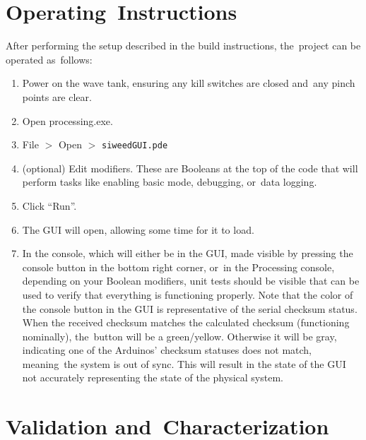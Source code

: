 \documentclass[hardware,article,submit,pdftex,moreauthors]{Definitions/mdpi}
\begin{document}
\section{Operating~Instructions}

After performing the setup described in the build instructions, the~project can be operated as~follows:
\begin{enumerate}
\item Power on the wave tank, ensuring any kill switches are closed and~any pinch points are clear.
\item Open processing.exe.
\item File $>$ Open $>$ \texttt{siweedGUI.pde} 
\item (optional) Edit modifiers. These are Booleans at the top of the code that will perform tasks like enabling basic mode, debugging, or~data logging.
\item Click ``Run''.
\item The GUI will open, allowing some time for it to load.
\item In the console, which will either be in the GUI, made visible by pressing the console button in the bottom right corner, or~in the Processing console, depending on your Boolean modifiers, unit tests should be visible that can be used to verify that everything is functioning properly. 
Note that the color of the console button in the GUI is representative of the serial checksum status.
When the received checksum matches the calculated checksum (functioning nominally), the~button will be a green/yellow.
Otherwise it will be gray, indicating one of the Arduinos' checksum statuses does not match, meaning~the system is out of sync.
This will result in the state of the GUI not accurately representing the state of the physical system.
\end{enumerate}

\section{Validation and~Characterization}
\end{document}
